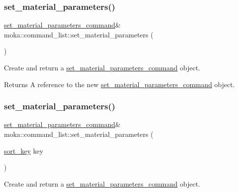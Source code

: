 \subsubsection{\texorpdfstring{set\_material\_parameters()}{set\_material\_parameters()}\hspace{0.1cm}{\footnotesize\ttfamily [1/2]}}
{\footnotesize\ttfamily \mbox{\hyperlink{classmoka_1_1set__material__parameters__command}{set\+\_\+material\+\_\+parameters\+\_\+command}}\& moka\+::command\+\_\+list\+::set\+\_\+material\+\_\+parameters (\begin{DoxyParamCaption}{ }\end{DoxyParamCaption})}



Create and return a \mbox{\hyperlink{classmoka_1_1set__material__parameters__command}{set\+\_\+material\+\_\+parameters\+\_\+command}} object. 

\begin{DoxyReturn}{Returns}
A reference to the new \mbox{\hyperlink{classmoka_1_1set__material__parameters__command}{set\+\_\+material\+\_\+parameters\+\_\+command}} object. 
\end{DoxyReturn}
\mbox{\label{classmoka_1_1command__list_af9edd3720785c82b0ead65d477ec3a38}} 
\subsubsection{\texorpdfstring{set\_material\_parameters()}{set\_material\_parameters()}\hspace{0.1cm}{\footnotesize\ttfamily [2/2]}}
{\footnotesize\ttfamily \mbox{\hyperlink{classmoka_1_1set__material__parameters__command}{set\+\_\+material\+\_\+parameters\+\_\+command}}\& moka\+::command\+\_\+list\+::set\+\_\+material\+\_\+parameters (\begin{DoxyParamCaption}\item[{\mbox{\hyperlink{namespacemoka_afa30a616e67b83113ebdb857555cf2bb}{sort\+\_\+key}}}]{key }\end{DoxyParamCaption})}



Create and return a \mbox{\hyperlink{classmoka_1_1set__material__parameters__command}{set\+\_\+material\+\_\+parameters\+\_\+command}} object. 


